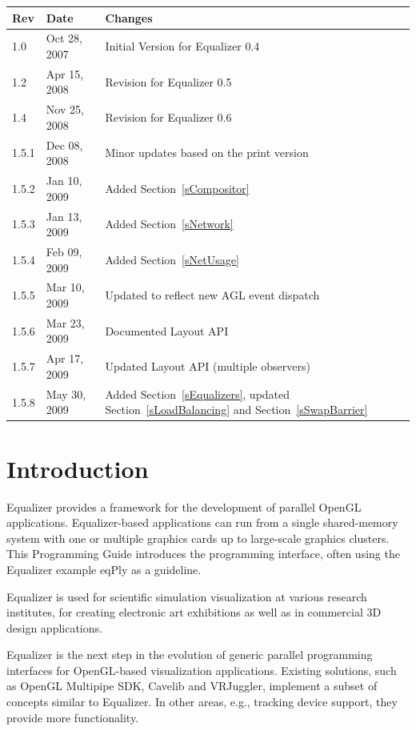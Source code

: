 \documentclass[10pt,a4]{scrartcl}
\newcommand{\sref}[1]{Section~\ref{#1}}
\begin{document}
\clearpage
{}
\pagestyle{headings}
\tableofcontents
\listoffigures \vfill{\center\begin{tabularx}{\textwidth}{|l|l|X|}
    \hline
    \bf Rev & \bf Date     & \bf Changes \\
    \hline
    1.0     & Oct 28, 2007 & Initial Version for Equalizer 0.4\\
    1.2     & Apr 15, 2008 & Revision for Equalizer 0.5\\
    1.4     & Nov 25, 2008 & Revision for Equalizer 0.6\\
    1.5.1   & Dec 08, 2008 & Minor updates based on the print version\\
    1.5.2   & Jan 10, 2009 & Added \sref{sCompositor}\\
    1.5.3   & Jan 13, 2009 & Added \sref{sNetwork}\\
    1.5.4   & Feb 09, 2009 & Added \sref{sNetUsage}\\
    1.5.5   & Mar 10, 2009 & Updated to reflect new AGL event dispatch\\
    1.5.6   & Mar 23, 2009 & Documented Layout API\\
    1.5.7   & Apr 17, 2009 & Updated Layout API (multiple observers)\\
    1.5.8   & May 30, 2009 & Added \sref{sEqualizers}, updated \sref{sLoadBalancing} and \sref{sSwapBarrier}\\
    \hline
  \end{tabularx}}
\clearpage

\pagestyle{headings}

\section{Introduction}

Equalizer provides a framework for the development of parallel OpenGL
applications. Equalizer-based applications can run from a single
shared-memory system with one or multiple graphics cards up to
large-scale graphics clusters. This Programming Guide introduces the
programming interface, often using the Equalizer example \textsf{eqPly}
as a guideline.

Equalizer is used for scientific simulation visualization at various
research institutes, for creating electronic art exhibitions as well as
in commercial 3D design applications.

Equalizer is the next step in the evolution of generic parallel programming
interfaces for OpenGL-based visualization applications. Existing
solutions, such as OpenGL Multipipe SDK, Cavelib and VRJuggler,
implement a subset of concepts similar to Equalizer. In other areas,
e.g., tracking device support, they provide more functionality.
\end{document}
